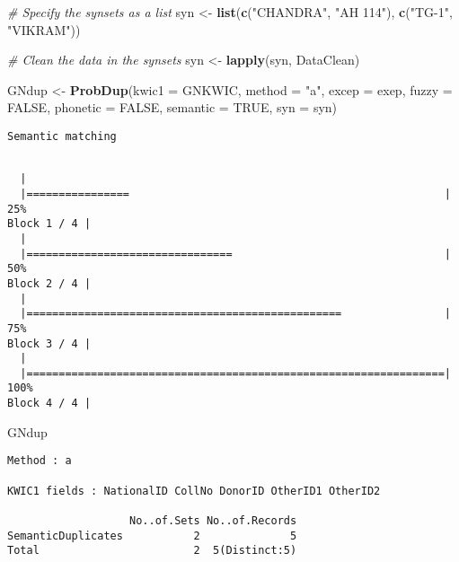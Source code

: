 \documentclass[]{article}
\newenvironment{Shaded}{\begin{snugshade}}{\end{snugshade}}
\newcommand{\CommentTok}[1]{\textcolor[rgb]{0.56,0.35,0.01}{\textit{#1}}}
\newcommand{\DataTypeTok}[1]{\textcolor[rgb]{0.13,0.29,0.53}{#1}}
\newcommand{\KeywordTok}[1]{\textcolor[rgb]{0.13,0.29,0.53}{\textbf{#1}}}
\newcommand{\NormalTok}[1]{#1}
\newcommand{\OtherTok}[1]{\textcolor[rgb]{0.56,0.35,0.01}{#1}}
\newcommand{\StringTok}[1]{\textcolor[rgb]{0.31,0.60,0.02}{#1}}
\begin{document}
\begin{Shaded}
\begin{Highlighting}[]
\CommentTok{# Specify the synsets as a list}
\NormalTok{syn <-}\StringTok{ }\KeywordTok{list}\NormalTok{(}\KeywordTok{c}\NormalTok{(}\StringTok{"CHANDRA"}\NormalTok{, }\StringTok{"AH 114"}\NormalTok{), }\KeywordTok{c}\NormalTok{(}\StringTok{"TG-1"}\NormalTok{, }\StringTok{"VIKRAM"}\NormalTok{))}

\CommentTok{# Clean the data in the synsets}
\NormalTok{syn <-}\StringTok{ }\KeywordTok{lapply}\NormalTok{(syn, DataClean)}

\NormalTok{GNdup <-}\StringTok{ }\KeywordTok{ProbDup}\NormalTok{(}\DataTypeTok{kwic1 =}\NormalTok{ GNKWIC, }\DataTypeTok{method =} \StringTok{"a"}\NormalTok{, }\DataTypeTok{excep =}\NormalTok{ exep, }
                 \DataTypeTok{fuzzy =} \OtherTok{FALSE}\NormalTok{, }\DataTypeTok{phonetic =} \OtherTok{FALSE}\NormalTok{,}
                 \DataTypeTok{semantic =} \OtherTok{TRUE}\NormalTok{, }\DataTypeTok{syn =}\NormalTok{ syn)}
\end{Highlighting}
\end{Shaded}

\begin{verbatim}
Semantic matching
\end{verbatim}

\begin{verbatim}

  |                                                                       
  |================                                                 |  25%
Block 1 / 4 |
  |                                                                       
  |================================                                 |  50%
Block 2 / 4 |
  |                                                                       
  |=================================================                |  75%
Block 3 / 4 |
  |                                                                       
  |=================================================================| 100%
Block 4 / 4 |
\end{verbatim}

\begin{Shaded}
\begin{Highlighting}[]
\NormalTok{GNdup}
\end{Highlighting}
\end{Shaded}

\begin{verbatim}
Method : a

KWIC1 fields : NationalID CollNo DonorID OtherID1 OtherID2
 
                   No..of.Sets No..of.Records
SemanticDuplicates           2              5
Total                        2  5(Distinct:5)
\end{verbatim}
\end{document}
